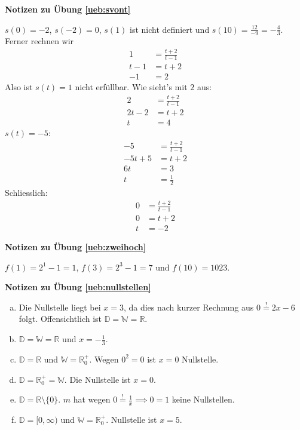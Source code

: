 \documentclass[%
<<<<<<< Updated upstream
11pt,%
twoside,%
titlepage,%
german,%
=======
11pt,%
twoside,%
titlepage,%
swissgerman,%
>>>>>>> Stashed changes
headsepline%
]{scrartcl}
\newcommand{\faReturnGray}{\textcolor{gray}{\faMailReply}} %
\theoremstyle{definition}
\theoremstyle{plain}
\newcommand{\concatueb}[1]{ueb:#1}%
\newcommand{\concatlsg}[1]{lsg:#1}%
\newenvironment{lsg}[1]{%
    \par\noindent\textbf{Notizen zu Übung \ref{\concatueb{#1}}}\label{\concatlsg{#1}}
    \hfill\hyperref[\concatueb{#1}]{\faReturnGray}\par %
}{%
    \par%
}
\newcommand{\concatueb}[1]{ueb:#1}%
\newcommand{\concatlsg}[1]{lsg:#1}%
\newenvironment{lsg}[1]{%
    \par\noindent\textbf{Notizen zu Übung \ref{\concatueb{#1}}.}%
    \label{\concatlsg{#1}}
}{%
    \par%
}
\begin{document}
\begin{lsg}{svont}
	$s(0)=-2$, $s(-2)=0$, $s(1)$ ist nicht definiert und $s(10)=\frac{12}{-9}=-\frac{4}{3}$. Ferner rechnen wir
	\begin{align*}
		1 &= \frac{t+2}{t-1}\tag{$\cdot(t-1)$}\\
		t-1 &= t+2\tag{$-t$}\\
		-1 &= 2
	\end{align*}
	Also ist $s(t)=1$ nicht erf\"ullbar. Wie sieht's mit $2$ aus:
	\begin{align*}
		2 &= \frac{t+2}{t-1}\tag{$\cdot(t-1)$}\\
		2t-2 &= t+2\tag{$-t+2$}\\
		t &= 4
	\end{align*}
	$s(t)=-5:$
	\begin{align*}
		-5 &= \frac{t+2}{t-1}\tag{$\cdot(t-1)$}\\
		-5t+5 &= t+2\tag{$+5t-2$}\\
		6t &= 3\tag{$\div6$}\\
		t &= \frac{1}{2}
	\end{align*}
	Schliesslich:
	\begin{align*}
		0 &= \frac{t+2}{t-1}\tag{$\cdot(t-1)$}\\
		0 &= t+2\tag{$-2$}\\
		t &= -2
	\end{align*}
\end{lsg}
\begin{lsg}{zweihoch}
	$f(1)=2^{1}-1=1$, $f(3)=2^{3}-1=7$ und $f(10)=1023$.
\end{lsg}
\begin{lsg}{nullstellen}
	\begin{enumerate}[a)]
		\item Die Nullstelle liegt bei $x=3$, da dies nach kurzer Rechnung aus $0\stackrel{!}{=}2x-6$ folgt. Offensichtlich ist $\mathbb{D}=\mathbb{W}=\mathbb{R}$.
		\item $\mathbb{D}=\mathbb{W}=\mathbb{R}$ und $x=-\frac{1}{3}$.
		\item $\mathbb{D}=\mathbb{R}$ und $\mathbb{W}=\mathbb{R}^{+}_{0}$. Wegen $0^{2}=0$ ist $x=0$ Nullstelle.
		\item $\mathbb{D}=\mathbb{R}^{+}_{0}=\mathbb{W}$. Die Nullstelle ist $x=0$.
		\item $\mathbb{D}=\mathbb{R}\setminus\{0\}$. $m$ hat wegen $0\stackrel{!}{=}\frac{1}{x}\implies0=1$ keine Nullstellen.
		\item $\mathbb{D}=[0,\infty)$ und $\mathbb{W}=\mathbb{R}^{+}_{0}$. Nullstelle ist $x=5$.
	\end{enumerate}
\end{lsg}
\end{document}
